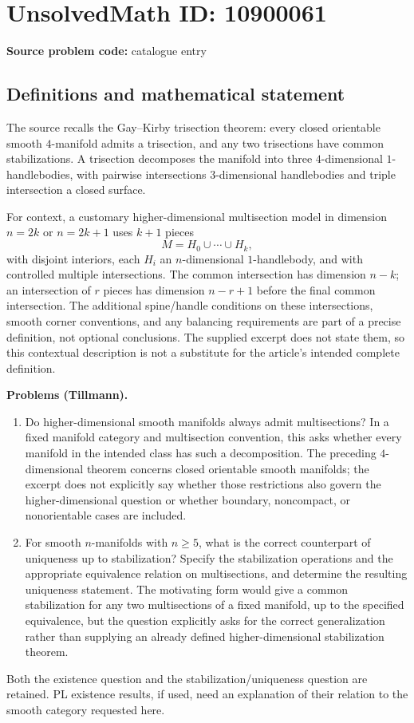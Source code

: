 \documentclass[11pt]{article}
\begin{document}
\section*{UnsolvedMath ID: 10900061}
\textbf{Source problem code:} catalogue entry
\subsection{Definitions and mathematical statement}
The source recalls the Gay--Kirby trisection theorem: every closed orientable smooth $4$-manifold admits a trisection, and any two trisections have common stabilizations. A trisection decomposes the manifold into three $4$-dimensional $1$-handlebodies, with pairwise intersections $3$-dimensional handlebodies and triple intersection a closed surface.

For context, a customary higher-dimensional multisection model in dimension $n=2k$ or $n=2k+1$ uses $k+1$ pieces
\[
 M=H_0\cup\cdots\cup H_k,
\]
with disjoint interiors, each $H_i$ an $n$-dimensional $1$-handlebody, and with controlled multiple intersections. The common intersection has dimension $n-k$; an intersection of $r$ pieces has dimension $n-r+1$ before the final common intersection. The additional spine/handle conditions on these intersections, smooth corner conventions, and any balancing requirements are part of a precise definition, not optional conclusions. The supplied excerpt does not state them, so this contextual description is not a substitute for the article's intended complete definition.

\textbf{Problems (Tillmann).}
\begin{enumerate}
\item Do higher-dimensional smooth manifolds always admit multisections? In a fixed manifold category and multisection convention, this asks whether every manifold in the intended class has such a decomposition. The preceding $4$-dimensional theorem concerns closed orientable smooth manifolds; the excerpt does not explicitly say whether those restrictions also govern the higher-dimensional question or whether boundary, noncompact, or nonorientable cases are included.
\item For smooth $n$-manifolds with $n\ge5$, what is the correct counterpart of uniqueness up to stabilization? Specify the stabilization operations and the appropriate equivalence relation on multisections, and determine the resulting uniqueness statement. The motivating form would give a common stabilization for any two multisections of a fixed manifold, up to the specified equivalence, but the question explicitly asks for the correct generalization rather than supplying an already defined higher-dimensional stabilization theorem.
\end{enumerate}
Both the existence question and the stabilization/uniqueness question are retained. PL existence results, if used, need an explanation of their relation to the smooth category requested here.
\end{document}
